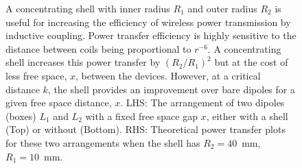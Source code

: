 \documentclass[11pt]{iopart}
\begin{document}
\begin{figure}
\begin{center}
\begin{minipage}{0.48\linewidth}
    \end{minipage}
  \end{center}
  \caption{A concentrating shell with inner radius $R_1$ and outer
    radius $R_2$ is useful for increasing the efficiency of wireless
    power transmission by inductive coupling. Power transfer efficiency is highly sensitive
    to the distance between coils being proportional to $r^{-6}$. A
    concentrating shell increases this power transfer by $(R_2/R_1)^2$
    but at the cost of less free space, $x$, between the
    devices. However, at a critical distance $k$, the shell provides
    an improvement over bare dipoles for a given free space distance,
    $x$. LHS: The arrangement of two dipoles (boxes) $L_1$ and $L_2$
    with a fixed free space gap $x$, either with a shell (Top) or
    without (Bottom). RHS: Theoretical power transfer plots for these
    two arrangements when the shell has $R_2 = 40$~mm, $R_1 =
    10$~mm.}\label{fig:d_motiv}
  \vspace{-0.7em}
\end{figure}
\end{document}
